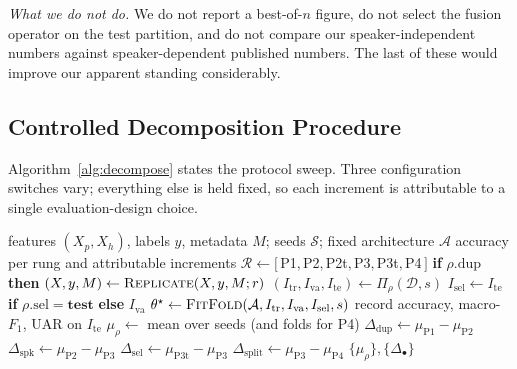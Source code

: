 \documentclass[journal,onecolumn,11pt,draftclsnofoot]{IEEEtran}   %
\begin{document}
\emph{What we do not do.} We do not report a best-of-$n$ figure, do not select
the fusion operator on the test partition, and do not compare our
speaker-independent numbers against speaker-dependent published numbers. The
last of these would improve our apparent standing considerably.

\subsection{Controlled Decomposition Procedure}
Algorithm~\ref{alg:decompose} states the protocol sweep. Three configuration
switches vary; everything else is held fixed, so each increment is attributable
to a single evaluation-design choice.

\begin{algorithm}[!t]
\caption{Controlled decomposition of the protocol effect}
\label{alg:decompose}
\begin{algorithmic}[1]
\Require features $(X_p,X_h)$, labels $y$, metadata $M$; seeds $\mathcal{S}$;
         fixed architecture $\mathcal{A}$
\Ensure accuracy per rung and attributable increments
\State $\mathcal{R} \gets [\,$P1$, $P2$, $P2t$, $P3$, $P3t$, $P4$\,]$
  \State \textbf{if} $\rho.\mathrm{dup}$ \textbf{then}
         $(X,y,M) \gets \textsc{Replicate}(X,y,M;r)$
    \State $(I_{\mathrm{tr}},I_{\mathrm{va}},I_{\mathrm{te}}) \gets
           \Pi_{\rho}(\mathcal{D}, s)$ 
    \State $I_{\mathrm{sel}} \gets I_{\mathrm{te}}$ \textbf{if}
           $\rho.\mathrm{sel}=\mathbf{test}$ \textbf{else} $I_{\mathrm{va}}$
    \State $\theta^\star \gets \textsc{FitFold}(\mathcal{A},I_{\mathrm{tr}},
           I_{\mathrm{va}},I_{\mathrm{sel}},s)$
    \State record accuracy, macro-$F_1$, UAR on $I_{\mathrm{te}}$
  \EndFor
  \State $\mu_\rho \gets$ mean over seeds (and folds for P4)
\EndFor
\State $\Delta_{\mathrm{dup}} \gets \mu_{\mathrm{P1}}-\mu_{\mathrm{P2}}$
\State $\Delta_{\mathrm{spk}} \gets \mu_{\mathrm{P2}}-\mu_{\mathrm{P3}}$
  \Comment{$\dagger$}
\State $\Delta_{\mathrm{sel}} \gets \mu_{\mathrm{P3t}}-\mu_{\mathrm{P3}}$
  \Comment{$\dagger$}
\State $\Delta_{\mathrm{split}} \gets \mu_{\mathrm{P3}}-\mu_{\mathrm{P4}}$
  \Comment{$\dagger$}
\State \Return $\{\mu_\rho\},\{\Delta_\bullet\}$
\end{algorithmic}
\end{algorithm}
\end{document}
